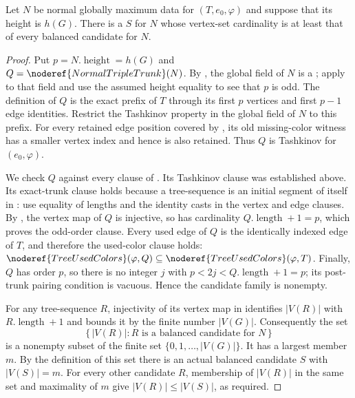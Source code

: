 \begin{helper}
Let $N$ be normal globally maximum data for $(T,e_0,\varphi)$ and suppose
that its height is $h(G)$.  There is a
 $S$ for $N$ whose vertex-set cardinality
is at least that of every balanced candidate for $N$.
\end{helper}
\begin{proof}
Put $p=N.\operatorname{height}=h(G)$ and
$Q=\noderef{NormalTripleTrunk}(N)$.  By
, the global field of $N$ is a
; apply  to
that field and use the assumed height equality to see that $p$ is odd.
The definition of $Q$ is the
exact prefix of $T$ through its first $p$ vertices and first $p-1$ edge
identities.  Restrict the Tashkinov property in the global field of $N$ to
this prefix.  For every retained edge position covered by
, its old missing-color witness has a smaller vertex
index and hence is also retained.  Thus $Q$ is Tashkinov for
$(e_0,\varphi)$.

We check $Q$ against every clause of
.  Its Tashkinov clause was established
above.  Its exact-trunk clause holds because a tree-sequence is an initial
segment of itself in
: use equality of lengths and the
identity casts in the vertex and edge clauses.  By
, the vertex map of $Q$ is injective, so
 has cardinality
$Q.\operatorname{length}+1=p$, which proves the odd-order clause.  Every
used edge of $Q$ is the identically indexed edge of $T$, and therefore the
used-color clause holds:
$\noderef{TreeUsedColors}(\varphi,Q)\subseteq
\noderef{TreeUsedColors}(\varphi,T)$.  Finally, $Q$ has order $p$, so there
is no integer $j$ with
$p<2j<Q.\operatorname{length}+1=p$; its post-trunk pairing condition is
vacuous.  Hence the candidate family is nonempty.

For any tree-sequence $R$, injectivity of its vertex map in
 identifies $|V(R)|$ with
$R.\operatorname{length}+1$ and bounds it by the finite number $|V(G)|$.
Consequently the set
\[
 \{\,|V(R)|:R\text{ is a balanced candidate for }N\,\}
\]
is a nonempty subset of the finite set
$\{0,1,\ldots,|V(G)|\}$.  It has a largest member $m$.  By the definition
of this set there is an actual balanced candidate $S$ with $|V(S)|=m$.
For every other candidate $R$, membership of $|V(R)|$ in the same set and
maximality of $m$ give $|V(R)|\le |V(S)|$, as required.
\end{proof}
